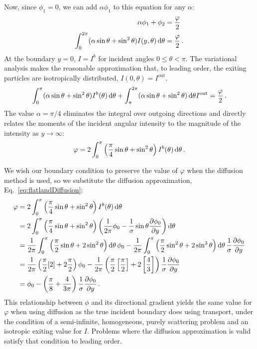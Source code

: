 Now, since $\phi_1=0$, we can add $\alpha \phi_1$ to this equation for any
$\alpha$:
\begin{align*}
 \alpha\phi_1 + \phi_{2} &= \frac{\varphi}{2} \\
 \int_{0}^{2\pi} (\alpha \sin\theta + \sin^2\theta)
 I(y,\theta) \mathop{}\!\mathrm{d}\theta
 &= \frac{\varphi}{2}\,.
\end{align*}
At the boundary $y=0$, $I=I^b$ for incident angles $0 \le \theta < \pi$. The
variational analysis makes the reasonable approximation that, to leading order,
the exiting particles are isotropically distributed, $I(0,\theta)=I^\text{out}$.
\begin{equation*}
 \int_{0}^{\pi} (\alpha \sin\theta + \sin^2\theta)
 I^b(\theta) \mathop{}\!\mathrm{d}\theta
 + \int_{\pi}^{2\pi} (\alpha \sin\theta + \sin^2\theta)\mathop{}\!\mathrm{d}\theta I^\text{out}
 = \frac{\varphi}{2}\,.
\end{equation*}
The value $\alpha=\pi/4$ eliminates the integral over outgoing directions and
directly relates the moments of the incident angular intensity to the
magnitude of the intensity as $y\to\infty$:
\begin{equation}\label{eq:varBoundary}
 \varphi = 2\int_{0}^{\pi} \left( \frac{\pi}{4} \sin\theta + \sin^2\theta \right)
 I^b(\theta) \mathop{}\!\mathrm{d}\theta
 \,.
\end{equation}

We wish our boundary condition to preserve the value of
$\varphi$ when the diffusion method is used, so we substitute the diffusion
approximation, Eq.~\eqref{eq:flatlandDiffusion}:
\begin{align*}
 \varphi &= 2\int_{0}^{\pi} \left( \frac{\pi}{4} \sin\theta + \sin^2\theta \right)
 I^b(\theta) \mathop{}\!\mathrm{d}\theta
 \\
 &= 
  2\int_{0}^{\pi} \left( \frac{\pi}{4} \sin\theta + \sin^2\theta \right)
 \left( \frac{1}{2\pi} \phi_0 -
  \frac{1}{\sigma} \sin\theta \frac{\partial \phi_0}{\partial y}\right)\mathop{}\!\mathrm{d}\theta
\\
 &= 
\frac{1}{2\pi} \int_{0}^{\pi} \left( \frac{\pi}{2} \sin\theta + 2 \sin^2\theta
\right)\mathop{}\!\mathrm{d}\theta
 \,\phi_0 -
 \frac{1}{2\pi} \int_{0}^{\pi} \left( \frac{\pi}{2} \sin^2\theta + 2 \sin^3\theta \right)\mathop{}\!\mathrm{d}\theta
  \,\frac{1}{\sigma} \frac{\partial \phi_0}{\partial y}
  \\
 &= 
 \frac{1}{2\pi} \left( \frac{\pi}{2} [2] + 2 \frac{\pi}{2}
\right) \phi_0
-
\frac{1}{2\pi} \left( \frac{\pi}{2} \left[ \frac{\pi}{2} \right] + 2 \left[
\frac{4}{3} \right] \right) \frac{1}{\sigma} \frac{\partial \phi_0}{\partial y}
\\
 &= 
  \phi_0
- \left( \frac{\pi}{8} + \frac{4}{3\pi} \right) \frac{1}{\sigma} \frac{\partial \phi_0}{\partial y}
\,.
\end{align*}
This relationship between $\phi$ and its directional gradient yields the same
value for $\varphi$ when using diffusion as the true incident boundary does
using transport, under the condition of a semi-infinite, homogeneous, purely
scattering problem and an isotropic exiting value for $I$. Problems where the
diffusion approximation is valid satisfy that condition to leading order.

